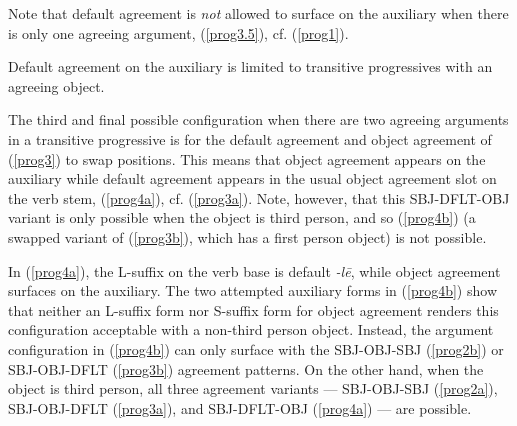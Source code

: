 \documentclass[output=paper
,modfonts
,nonflat]{langsci/langscibook}
\begin{document}
\noindent Note that default agreement is \textit{not} allowed to surface on the auxiliary when there is only one agreeing argument, (\ref{prog3.5}), cf. (\ref{prog1}).

\eal \label{prog3.5}
\zl

\noindent Default agreement on the auxiliary is limited to transitive progressives with an agreeing object.

The third and final possible configuration when there are two agreeing arguments in a transitive progressive is for the default agreement and object agreement of (\ref{prog3}) to swap positions. This means that object agreement appears on the auxiliary while default agreement appears in the usual object agreement slot on the verb stem, (\ref{prog4a}), cf. (\ref{prog3a}). Note, however, that this SBJ-DFLT-OBJ variant is only possible when the object is third person, and so (\ref{prog4b}) (a swapped variant of (\ref{prog3b}), which has a first person object) is not possible.

\eal \label{prog4}
\zl

\noindent In (\ref{prog4a}), the L-suffix on the verb base is default \textit{-l\=e}, while object agreement surfaces on the auxiliary. The two attempted auxiliary forms in (\ref{prog4b}) show that neither an L-suffix form nor S-suffix form for object agreement renders this configuration acceptable with a non-third person object. Instead, the argument configuration in (\ref{prog4b}) can only surface with the SBJ-OBJ-SBJ (\ref{prog2b}) or SBJ-OBJ-DFLT (\ref{prog3b}) agreement patterns. On the other hand, when the object is third person, all three agreement variants --- SBJ-OBJ-SBJ (\ref{prog2a}), SBJ-OBJ-DFLT (\ref{prog3a}), and SBJ-DFLT-OBJ (\ref{prog4a}) --- are possible.
\end{document}
